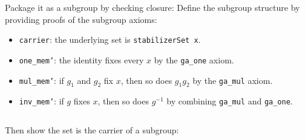 \documentclass[
  12pt, %
]{assignment}
\newcommand{\leancodeurl}{}
\newcommand{\setleancodeurl}[1]{\renewcommand{\leancodeurl}{#1}}
\newcommand{\leancodefile}[3][]{%
  \setleancodeurl{#3}%
  \inputminted[fontsize=\footnotesize,breaklines,breakanywhere,tabsize=4,showspaces=false,linenos=true,#1]{lean4}{#2}%
}
\begin{document}
Package it as a subgroup by checking closure:
Define the subgroup structure by providing proofs of the subgroup axioms:
\begin{itemize}
	\item \texttt{carrier}: the underlying set is \texttt{stabilizerSet x}.
	\item \texttt{one\_mem'}: the identity fixes every $x$ by the \texttt{ga\_one} axiom.
	\item \texttt{mul\_mem'}: if $g_1$ and $g_2$ fix $x$, then so does $g_1 g_2$ by the
	      \texttt{ga\_mul} axiom.
	\item \texttt{inv\_mem'}: if $g$ fixes $x$, then so does $g^{-1}$ by combining
	      \texttt{ga\_mul} and \texttt{ga\_one}.
\end{itemize}
\leancodefile[firstline=28,lastline=52,firstnumber=28]{../lean/GroupAction/Stabilizer.lean}{https://github.com/FrankieeW/GroupAction/blob/v1.2.0/lean/GroupAction/Stabilizer.lean}

Then show the set is the carrier of a subgroup:
\leancodefile[firstline=55,lastline=57,firstnumber=55]{../lean/GroupAction/Stabilizer.lean}{https://github.com/FrankieeW/GroupAction/blob/v1.2.0/lean/GroupAction/Stabilizer.lean}

\end{document}
